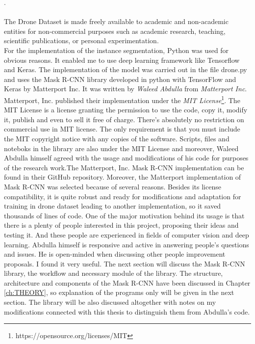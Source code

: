 .\\
\\
The Drone Dataset is made freely available to academic and non-academic entities for non-commercial purposes such as academic research, teaching, scientific publications, or personal experimentation.
\\
For the implementation of the instance segmentation, Python was used for obvious reasons. It enabled me to use deep learning framework like Tensorflow and Keras. The implementation of the model was carried out in the file drone.py and uses the Mask R-CNN library developed in python with TensorFlow and Keras by Matterport Inc. It was written by \textit{Waleed Abdulla} from \textit{Matterport Inc}. Matterport, Inc. published their implementation under the\textit{ MIT License}\footnote{https://opensource.org/licenses/MIT}. The MIT License is a license granting the permission to use the code, copy it, modify it, publish and even to sell it free of charge.
There's absolutely no restriction on commercial use in MIT license. The only requirement is that you must include the MIT copyright notice with any copies of the software. Scripts, files and noteboks in the library are also under the MIT License and moreover, Waleed Abdulla himself agreed with the usage and modifications of his code for purposes of the research work.The Matterport, Inc. Mask R-CNN implementation can be found in their GitHub repository.
Moreover, the Matterport implementation of Mask R-CNN was selected because of several reasons. Besides its license compatibility, it is quite robust and ready for modifications and adaptation for training in drone dataset leading to another implementation, so it saved thousands of lines of code. One of the major motivation behind its usage is that there is a plenty of people interested in this project, proposing their ideas and testing it. And these people are experienced in fields of computer vision and deep learning. Abdulla himself is responsive and active in answering people’s questions and issues. He is open-minded when discussing other people improvement proposals. I found it very useful.
The next section will discuss the Mask R-CNN library, the workflow and necessary module of the library. The structure, architecture and components of the Mask R-CNN have been discussed in Chapter \ref{ch:THEORY}, so explanation of the programs only will be given in the next section. The library will be also discussed altogether with notes on my modifications connected with this thesis to distinguish them from Abdulla’s code.

